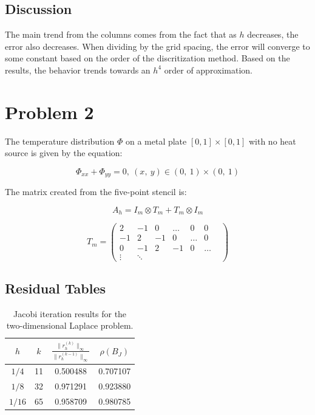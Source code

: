 \documentclass{article}
\begin{document}
\newpage

\subsection*{Discussion}

The main trend from the columns comes from the fact that as $h$ decreases, the error also decreases.
When dividing by the grid spacing, the error will converge to some constant based on the order of the discritization method.
Based on the results, the behavior trends towards an $h^4$ order of approximation.

\section*{Problem 2}

The temperature distribution $\Phi$ on a metal plate $[0,1]\times[0,1]$ with no heat source is given by the equation:

$$\Phi_{xx} + \Phi_{yy} = 0, \ (x, \ y)\in (0, \ 1) \times (0,\ 1)$$

\noindent The matrix created from the five-point stencil is:

$$A_h = I_m \otimes T_m + T_m \otimes I_m$$

\[
    T_m = \begin{pmatrix}
            2 & -1 & 0 & \dots & 0 & 0 \\
            -1 & 2 & -1 & 0 & \dots & 0\\
            0 & -1 & 2 & -1 & 0 & \dots & \\
            \vdots & \ddots
        \end{pmatrix}
\]

\subsection*{Residual Tables}

\begin{table}[h!]
\centering
\caption{Jacobi iteration results for the two-dimensional Laplace problem.}
\begin{tabular}{|c c c c|}
\hline
$h$ & $k$ &
$\displaystyle \frac{\|r_h^{(k)}\|_\infty}
{\|r_h^{(k-1)}\|_\infty}$ &
$\rho(B_J)$ \\
\hline
$1/4$  & 11 & 0.500488 & 0.707107 \\
$1/8$  & 32 & 0.971291 & 0.923880 \\
$1/16$ & 65 & 0.958709 & 0.980785 \\
\hline
\end{tabular}
\end{table}
\end{document}
